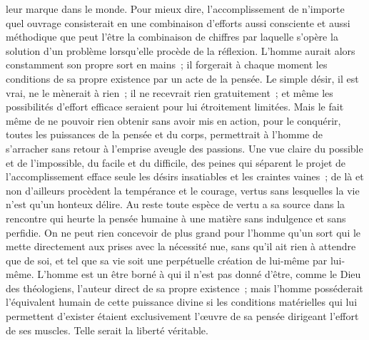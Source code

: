 \documentclass[french,twoside]{book} %
\begin{document}
leur marque dans le monde. Pour mieux dire, l'accomplissement de n'importe quel ouvrage consisterait en une combinaison d'efforts aussi consciente et aussi méthodique que peut l'être la combinaison de chiffres par laquelle s'opère la solution d'un problème lorsqu'elle procède de la réflexion. L'homme aurait alors constamment son propre sort en mains ; il forgerait à chaque moment les conditions de sa propre existence par un acte de la pensée. Le simple désir, il est vrai, ne le mènerait à rien ; il ne recevrait rien gratuitement ; et même les possibilités d'effort efficace seraient pour lui étroitement limitées. Mais le fait même de ne pouvoir rien obtenir sans avoir mis en action, pour le conquérir, toutes les puissances de la pensée et du corps, permettrait à l'homme de s'arracher sans retour à l'emprise aveugle des passions. Une vue claire du possible et de l'impossible, du facile et du difficile, des peines qui séparent le projet de l'accomplissement efface seule les désirs insatiables et les craintes vaines ; de là et non d'ailleurs procèdent la tempérance et le courage, vertus sans lesquelles la vie n'est qu'un honteux délire. Au reste toute espèce de vertu a sa source dans la rencontre qui heurte la pensée humaine à une matière sans indulgence et sans perfidie. On ne peut rien concevoir de plus grand pour l'homme qu'un sort qui le mette directement aux prises avec la nécessité nue, sans qu'il ait rien à attendre que de soi, et tel que sa vie soit une perpétuelle création de lui-même par lui-même. L'homme est un être borné à qui il n'est pas donné d'être, comme le Dieu des théologiens, l'auteur direct de sa propre existence ; mais l'homme posséderait l'équivalent humain de cette puissance divine si les conditions matérielles qui lui permettent d'exister étaient exclusivement l'œuvre de sa pensée dirigeant l'effort de ses muscles. Telle serait la liberté véritable.\par
\end{document}
